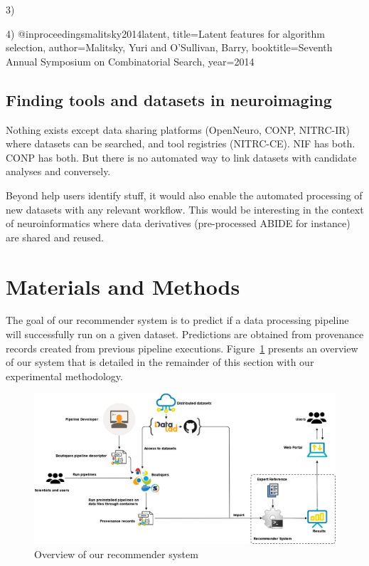 \documentclass[conference]{IEEEtran}
\begin{document}
3)~\cite{bischl2016aslib}

4) @inproceedings{malitsky2014latent,
  title={Latent features for algorithm selection},
  author={Malitsky, Yuri and O'Sullivan, Barry},
  booktitle={Seventh Annual Symposium on Combinatorial Search},
  year={2014}
}


\subsection{Finding tools and datasets in neuroimaging}

Nothing exists except data sharing platforms (OpenNeuro, CONP, NITRC-IR) where datasets can be searched, and tool registries (NITRC-CE). NIF has both. CONP has both. But there is no automated way to link datasets with candidate analyses and conversely. 

Beyond help users identify stuff, it would also enable the automated processing of 
new datasets with any relevant workflow. This would be interesting in the context of 
neuroinformatics where data derivatives (pre-processed ABIDE for instance) are shared and reused.

\section{Materials and Methods}

The goal of our recommender system is to predict if a data processing
pipeline will successfully run on a given dataset. Predictions are obtained
from provenance records created from previous pipeline executions.
Figure~\ref{fig:method} presents an overview of our system that is detailed
in the remainder of this section with our experimental methodology.

\begin{figure}[ht]
  \centering
  \includegraphics[width=\textwidth]{figures/Methodology_noZenodo.png}%
  \caption{Overview of our recommender system }
  \label{fig:method}
  \end{figure}  
\end{document}

